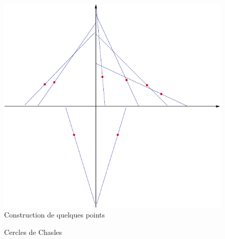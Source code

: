 \begin{figure}[ht]
 \centering
 \includegraphics{Cconi1_1.pdf}
\caption{Construction de quelques points}
\label{fig:Cconi_1}
\end{figure} 
\begin{figure}[ht]
 \centering

\caption{Cercles de Chasles}
\label{fig:Cconi_2}
\end{figure}

